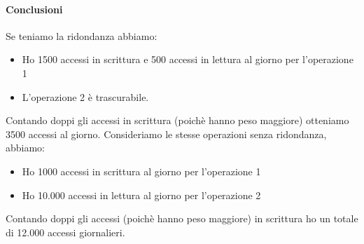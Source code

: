 \paragraph{Conclusioni} Se teniamo la ridondanza abbiamo:
\begin{itemize}
	\item Ho 1500 accessi in scrittura e 500 accessi in lettura al giorno per l'operazione 1
	\item L'operazione 2 è trascurabile.
\end{itemize}
Contando doppi gli accessi in scrittura (poichè hanno peso maggiore) otteniamo 3500 accessi al giorno. Consideriamo le stesse operazioni senza ridondanza, abbiamo:
\begin{itemize}
	\item Ho 1000 accessi in scrittura al giorno per l'operazione 1
	\item Ho 10.000 accessi in lettura al giorno per l'operazione 2
\end{itemize}
Contando doppi gli accessi (poichè hanno peso maggiore) in scrittura ho un totale di 12.000 accessi giornalieri.
\pagebreak
